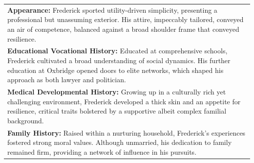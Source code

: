 \documentclass[11pt]{article}
\begin{document}
\begin{table}[ht]
\begin{tabularx}{\textwidth}{X}
\textbf{Appearance:} Frederick sported utility-driven simplicity, presenting a professional but unassuming exterior. His attire, impeccably tailored, conveyed an air of competence, balanced against a broad shoulder frame that conveyed resilience. \\[4pt]

\textbf{Educational Vocational History:} Educated at comprehensive schools, Frederick cultivated a broad understanding of social dynamics. His further education at Oxbridge opened doors to elite networks, which shaped his approach as both lawyer and politician. \\[4pt]

\textbf{Medical Developmental History:} Growing up in a culturally rich yet challenging environment, Frederick developed a thick skin and an appetite for resilience, critical traits bolstered by a supportive albeit complex familial background. \\[4pt]

\textbf{Family History:} Raised within a nurturing household, Frederick's experiences fostered strong moral values. Although unmarried, his dedication to family remained firm, providing a network of influence in his pursuits. \\[4pt]

\bottomrule
\end{tabularx}
\end{table}
\end{document}
